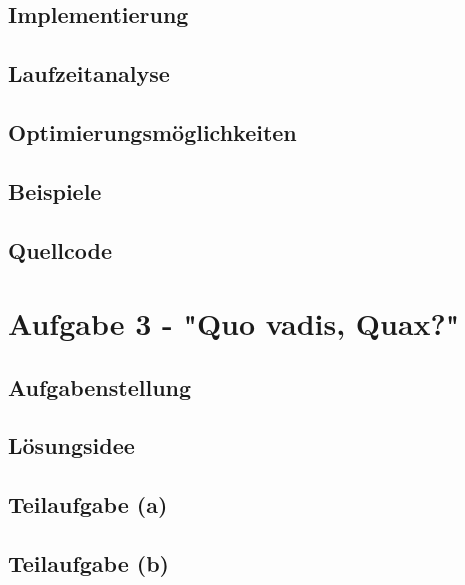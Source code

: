\documentclass[a4paper,12pt]{article}			%
\begin{document}
\subsection{Implementierung}

\subsection{Laufzeitanalyse}

\subsection{Optimierungsmöglichkeiten}

\subsection{Beispiele}

\subsection{Quellcode}


\newpage
\section{Aufgabe 3 - "Quo vadis, Quax?"}



\subsection{Aufgabenstellung}

\subsection{Lösungsidee}

\subsection{Teilaufgabe (a)}

\subsection{Teilaufgabe (b)}
\end{document}

